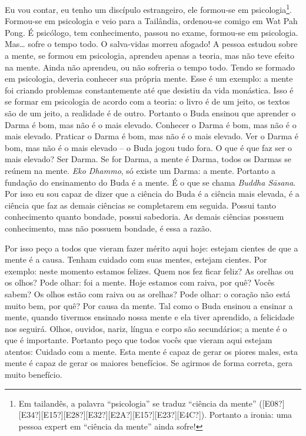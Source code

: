 Eu vou contar, eu tenho um discípulo estrangeiro, ele formou-se em
psicologia\footnote{Em tailandês, a palavra “psicologia” se traduz
“ciência da mente”
([E08?][E34?][E15?][E28?][E32?][E2A?][E15?][E23?][E4C?]). Portanto a
ironia: uma pessoa expert em “ciência da mente” ainda sofre!}.
Formou-se em psicologia e veio para a Tailândia, ordenou-se comigo em
Wat Pah Pong. É psicólogo, tem conhecimento, passou no exame, formou-se
em psicologia. Mas… sofre o tempo todo. O salva-vidas morreu afogado! A
pessoa estudou sobre a mente, se formou em psicologia, aprendeu apenas
a teoria, mas não teve efeito na mente. Ainda não aprendeu, ou não
sofreria o tempo todo. Tendo se formado em psicologia, deveria conhecer
sua própria mente. Esse é um exemplo: a mente foi criando problemas
constantemente até que desistiu da vida monástica. Isso é se formar em
psicologia de acordo com a teoria: o livro é de um jeito, os textos são
de um jeito, a realidade é de outro. Portanto o Buda ensinou que
aprender o Darma é bom, mas não é o mais elevado. Conhecer o Darma é
bom, mas não é o mais elevado. Praticar o Darma é bom, mas não é o mais
elevado. Ver o Darma é bom, mas não é o mais elevado
– o Buda jogou tudo fora. O que é que faz ser o mais
elevado? Ser Darma. Se for Darma, a mente é Darma, todos os Darmas se
reúnem na mente. \textit{Eko Dhammo}, só existe um Darma: a mente.
Portanto a fundação do ensinamento do Buda é a mente. É o que se chama
\textit{Buddha S\=asana}. Por isso eu sou capaz de dizer que a ciência
do Buda é a ciência mais elevada, é a ciência que faz as demais
ciências se completarem em seguida. Possui tanto conhecimento quanto
bondade, possui sabedoria. As demais ciências possuem conhecimento, mas
não possuem bondade, é essa a razão. 

Por isso peço a todos que vieram fazer mérito aqui hoje: estejam
cientes de que a mente é a causa. Tenham cuidado com suas mentes,
estejam cientes. Por exemplo: neste momento estamos felizes. Quem nos
fez ficar feliz? As orelhas ou os olhos? Pode olhar: foi a mente. Hoje
estamos com raiva, por quê? Vocês sabem? Os olhos estão com raiva ou as
orelhas? Pode olhar: o coração não está muito bem, por quê? Por causa
da mente. Tal como o Buda ensinou a ensinar a mente, quando tivermos
ensinado nossa mente e ela tiver aprendido, a felicidade nos seguirá.
Olhos, ouvidos, nariz, língua e corpo são secundários; a mente é o que
é importante. Portanto peço que todos vocês que vieram aqui estejam
atentos: Cuidado com a mente. Esta mente é capaz de gerar os piores
males, esta mente é capaz de gerar os maiores benefícios. Se agirmos de
forma correta, gera muito benefício. 

